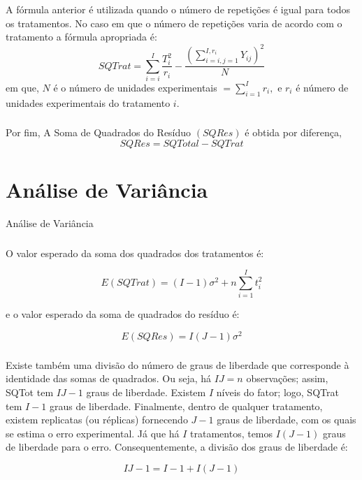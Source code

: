 \documentclass[14pt,aspectratio=1610]{beamer}
\begin{document}
\begin{frame}{}
\frametitle{}
\begin{block}{}
\justifying
A fórmula anterior é utilizada quando o número de repetições é igual para todos os
tratamentos. No caso em que o número de repetições varia de acordo com o tratamento a
fórmula apropriada é:
$$
SQTrat=
{\displaystyle \sum_{i=i}^{I}\dfrac{T_{i}^{2}}{r_{i}}-\dfrac{\left({\displaystyle \sum_{i=i,j=1}^{I,r_{i}}Y_{ij}}\right)^{2}}{N}}
$$
em que, $N$ é o número de unidades experimentais $={\displaystyle \sum_{i=1}^{I}r_{i}},$ e $r_{i}$ é número de unidades experimentais do tratamento $i.$
\end{block}
\end{frame}

\begin{frame}{}
\frametitle{}
\begin{block}{}
\justifying
Por fim, A Soma de Quadrados do Resíduo $(SQRes)$ é obtida por diferença,
$$SQRes=SQTotal-SQTrat$$
\end{block}
\end{frame}

\section{Análise de Variância}
\begin{frame}{Análise de Variância}
\frametitle{}
\begin{block}{}
\justifying
O valor esperado da soma dos quadrados dos tratamentos é:

$${\displaystyle E(SQTrat)=(I-1)\sigma^{2}+n\sum_{i=1}^{I}t_{i}^{2}}$$

e o valor esperado da soma de quadrados do resíduo é:

$$E(SQRes)=I(J-1)\sigma^{2}$$


\end{block}
\end{frame}

\begin{frame}{}
\frametitle{}
\begin{block}{}
\justifying
Existe também uma divisão do número de graus de liberdade que corresponde à identidade das somas de quadrados. Ou seja, há $IJ = n$ observações; assim, SQTot tem $IJ-1$ graus de liberdade. Existem $I$ níveis do fator; logo, SQTrat tem $I-1$ graus de liberdade. Finalmente, dentro de qualquer tratamento, existem replicatas (ou réplicas) fornecendo $J-1$ graus de liberdade, com os quais se estima o erro experimental. Já que há $I$ tratamentos, temos $I(J-1)$ graus de liberdade para o erro. Consequentemente, a divisão dos graus de liberdade é:

$$IJ-1=I-1+I(J-1)$$

\end{block}
\end{frame}
\end{document}
